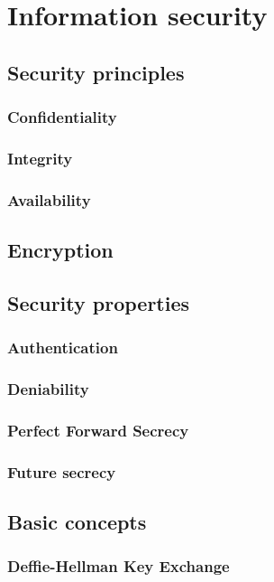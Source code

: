 
\section{Information security }

\subsection{Security principles}
\subsubsection{Confidentiality}
\subsubsection{Integrity}
\subsubsection{Availability}

\subsection{Encryption}

\subsection{Security properties}
\subsubsection{Authentication}
\subsubsection{Deniability}
\subsubsection{Perfect Forward Secrecy}
\subsubsection{Future secrecy}

\subsection{Basic concepts}
\subsubsection{Deffie-Hellman Key Exchange}

